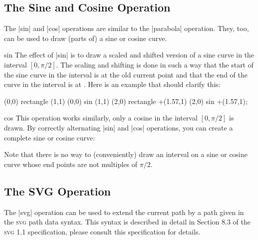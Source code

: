 \subsection{The Sine and Cosine Operation}

The |sin| and |cos| operations are similar to the |parabola| operation. They,
too, can be used to draw (parts of) a sine or cosine curve.

\begin{pathoperation}{sin}{}
    The effect of |sin| is to draw a scaled and shifted version of a sine curve
    in the interval $[0,\pi/2]$. The scaling and shifting is done in such a way
    that the start of the sine curve in the interval is at the old current
    point and that the end of the curve in the interval is at
    . Here is an example that should clarify this:
\begin{codeexample}[]
\tikz \draw (0,0) rectangle (1,1)     (0,0) sin (1,1)
            (2,0) rectangle +(1.57,1) (2,0) sin +(1.57,1);
\end{codeexample}
\end{pathoperation}

\begin{pathoperation}{cos}{}
    This operation works similarly, only a cosine in the interval $[0,\pi/2]$
    is drawn. By correctly alternating |sin| and |cos| operations, you can
    create a complete sine or cosine curve:
\begin{codeexample}[]
\end{codeexample}
\end{pathoperation}

Note that there is no way to (conveniently) draw an interval on a sine or
cosine curve whose end points are not multiples of $\pi/2$.


\subsection{The SVG Operation}

The |svg| operation can be used to extend the current path by a path given in
the \textsc{svg} path data syntax. This syntax is described in detail in
Section 8.3 of the \textsc{svg 1.1} specification, please consult this
specification for details.

